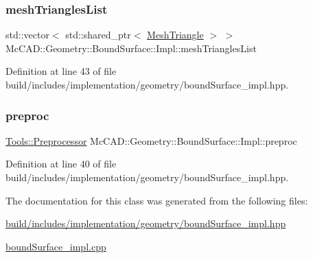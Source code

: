 \subsubsection{\texorpdfstring{mesh\+Triangles\+List}{meshTrianglesList}}
{\footnotesize\ttfamily std\+::vector$<$ std\+::shared\+\_\+ptr$<$ \hyperlink{classMcCAD_1_1Geometry_1_1MeshTriangle}{Mesh\+Triangle} $>$ $>$ Mc\+C\+A\+D\+::\+Geometry\+::\+Bound\+Surface\+::\+Impl\+::mesh\+Triangles\+List}



Definition at line 43 of file build/includes/implementation/geometry/bound\+Surface\+\_\+impl.\+hpp.

\mbox{\label{classMcCAD_1_1Geometry_1_1BoundSurface_1_1Impl_aa3e99ab2a3f300708a6d7d5fd7f132b3}} 
\subsubsection{\texorpdfstring{preproc}{preproc}}
{\footnotesize\ttfamily \hyperlink{classMcCAD_1_1Tools_1_1Preprocessor}{Tools\+::\+Preprocessor} Mc\+C\+A\+D\+::\+Geometry\+::\+Bound\+Surface\+::\+Impl\+::preproc}



Definition at line 40 of file build/includes/implementation/geometry/bound\+Surface\+\_\+impl.\+hpp.



The documentation for this class was generated from the following files\+:\begin{DoxyCompactItemize}
\item 
\hyperlink{build_2includes_2implementation_2geometry_2boundSurface__impl_8hpp}{build/includes/implementation/geometry/bound\+Surface\+\_\+impl.\+hpp}\item 
\hyperlink{boundSurface__impl_8cpp}{bound\+Surface\+\_\+impl.\+cpp}\end{DoxyCompactItemize}

